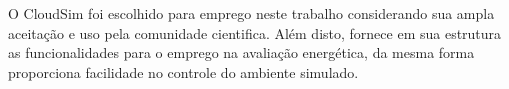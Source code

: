 \documentclass[tcc,capa]{texufpel}
\begin{document}

O CloudSim foi escolhido para emprego neste trabalho considerando sua ampla aceitação e uso pela comunidade cientifica. Além disto, fornece em sua estrutura as funcionalidades para o emprego na avaliação energética, da mesma forma proporciona facilidade no controle do ambiente simulado.

\end{document}
